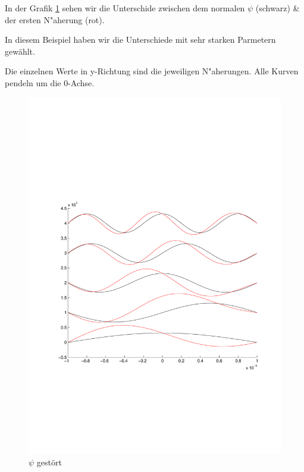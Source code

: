 \begin{refsection}
In der Grafik \ref{abb:efeld_psi_gestoert} sehen wir die Unterschide zwischen dem normalen $\psi$ (schwarz) \& der ersten N"aherung (rot).

In diesem Beispiel haben wir die Unterschiede mit sehr starken Parmetern gewählt.

Die einzelnen Werte in y-Richtung sind die jeweiligen N"aherungen. Alle Kurven pendeln um die 0-Achse.

\begin{figure}
 \centering
 \includegraphics[width=12cm,clip=true,trim=2cm 7cm 1cm 8cm]{efeld/Psi_gestoert.pdf}
 \caption{$\psi$ gest\"ort}
 \label{abb:efeld_psi_gestoert}
\end{figure}



\end{refsection}
